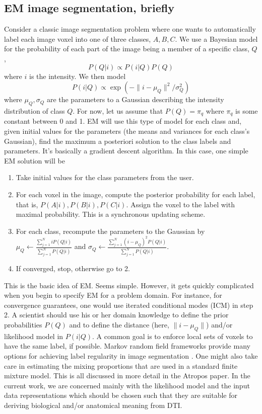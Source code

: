 \documentclass[11pt,english]{article}
\begin{document}
\subsection{EM image segmentation, briefly} 
Consider a classic image segmentation problem where one wants to
automatically label each image voxel into one of three classes, $A, B, C$.  We
use a Bayesian model for the probability of each part of the image being a member of a
specific class, $Q$, 
$$
P( Q | i ) \propto P ( i | Q ) P( Q ) 
$$
where $i$ is the intensity.
We then model 
$$ P( i | Q )  \propto \exp( - \| i - \mu_Q \|^2 / \sigma_Q^2 ) $$ 
where $\mu_Q , \sigma_Q$ are the parameters to a Gaussian describing
the intensity distribution of class $Q$.  For now, let us assume that
$P(Q)=\pi_q$ where $\pi_q$ is some constant between 0 and 1.  EM will use this
type of model for each class and, given initial values for the
parameters (the means and variances for each class's Gaussian), find
the maximum a posteriori solution to the class labels and parameters.
It's basically a gradient descent algorithm.  In this case, one simple EM
solution will be 
\begin{enumerate}
\item Take initial values for the class parameters from the user.
\item For each voxel in the image, compute the posterior probability
  for each label, that is, $P(A|i), P(B|i), P(C|i)$.  Assign the voxel
  to the label with maximal probability.  This is a synchronous
  updating scheme.  
\item For each class, recompute the parameters to the Gaussian by 
$ \mu_Q \leftarrow \frac{\sum_{j=1}^N i P(Q|i)}{\sum_{j=1}^N P(Q|i)}$
and $ \sigma_Q \leftarrow \frac{\sum_{j=1}^N (i-\mu_Q)^2 P(Q|i)}{\sum_{j=1}^N P(Q|i)}$.
\item If converged, stop, otherwise go to 2.  
\end{enumerate}
This is the basic idea of EM.  Seems simple.  However, it gets quickly complicated when
you begin to specify EM for a problem domain.  For instance, for
convergence guarantees, one would use iterated conditional modes (ICM)
in step 2.  A scientist should use his or her domain knowledge to
define the prior probabilities $P(Q)$ and to define the distance
(here, $\| i -\mu_Q \|$) and/or likelihood model in
$P(i|Q)$.  A common goal is to enforce local sets of voxels to have the same label, if possible.  Markov
random field frameworks provide many options for achieving label regularity 
in image segmentation \citep{Besag1986}.  One might also take care in estimating the mixing proportions that are
used in a standard finite mixture model.  This is all discussed in more detail
in the Atropos paper.  In the current work, we are concerned mainly
with the likelihood model and the input data representations which should be
chosen such that they are suitable for deriving biological and/or anatomical meaning from DTI. 
\end{document}
